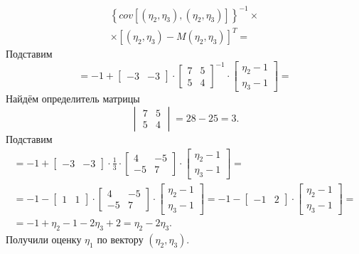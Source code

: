 \begin{enumerate}[label=\alph*)]
\begin{gather*}
    \left\{
      cov \left[
        \left( \eta_2, \eta_3 \right), \left( \eta_2, \eta_3 \right)
      \right]
    \right\}^{-1} \times \\
    \times \left[
      \left( \eta_2, \eta_3 \right) - M \left( \eta_2, \eta_3 \right)
    \right]^T =
  \end{gather*}
  Подставим
  \begin{equation*}
    = -1 +
    \begin{bmatrix}
      -3 & -3
    \end{bmatrix} \cdot
    \begin{bmatrix}
      7 & 5 \\
      5 & 4
    \end{bmatrix}^{-1} \cdot
    \begin{bmatrix}
      \eta_2 - 1 \\
      \eta_3 - 1
    \end{bmatrix} =
  \end{equation*}
  Найдём определитель матрицы
  \begin{equation*}
    \begin{vmatrix}
      7 & 5 \\
      5 & 4
    \end{vmatrix} =
    28 - 25 =
    3.
  \end{equation*}
  Подставим
  \begin{gather*}
    = -1 +
    \begin{bmatrix}
      -3 & -3
    \end{bmatrix} \cdot \frac{1}{3} \cdot
    \begin{bmatrix}
      4 & -5 \\
      -5 & 7
    \end{bmatrix} \cdot
    \begin{bmatrix}
      \eta_2 - 1 \\
      \eta_3 - 1
    \end{bmatrix} = \\
    = -1 -
    \begin{bmatrix}
      1 & 1
    \end{bmatrix} \cdot
    \begin{bmatrix}
      4 & -5 \\
      -5 & 7
    \end{bmatrix} \cdot
    \begin{bmatrix}
      \eta_2 - 1 \\
      \eta_3 - 1
    \end{bmatrix} =
    -1 -
    \begin{bmatrix}
      -1 & 2
    \end{bmatrix} \cdot
    \begin{bmatrix}
      \eta_2 - 1 \\
      \eta_3 - 1
    \end{bmatrix} = \\
    = -1 + \eta_2 - 1 - 2 \eta_3 + 2 =
    \eta_2 - 2 \eta_3.
  \end{gather*}
  Получили оценку $ \eta_1 $ по вектору $ \left( \eta_2, \eta_3 \right) $.
\end{enumerate}
